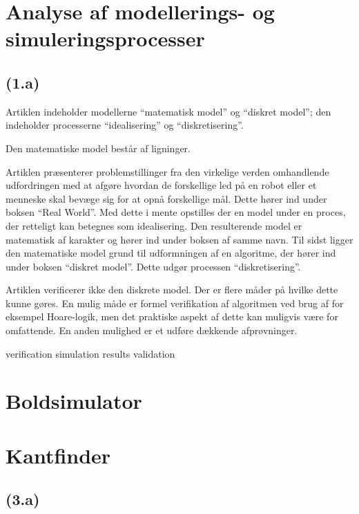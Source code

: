 \documentclass{article}
\author{Mikkel Kragh Mathiesen, Jannik Gram, Rune \& Rasmus Abrahams{\tt (son|en)}}
\title{}
\date{\today}
\begin{document}
\maketitle

\section{Analyse af modellerings- og simuleringsprocesser}
\subsection*{(1.a)}
Artiklen indeholder modellerne ``matematisk model'' og ``diskret model''; den indeholder processerne ``idealisering'' og ``diskretisering''.

Den matematiske model består af ligninger.

Artiklen præsenterer problemstillinger fra den virkelige verden omhandlende udfordringen med at afgøre hvordan de forskellige led på en robot eller et menneske skal bevæge sig for at opnå forskellige mål. Dette hører ind under boksen ``Real World''. Med dette i mente opstilles der en model under en proces, der retteligt kan betegnes som idealisering. Den resulterende model er matematisk af karakter og hører ind under boksen af samme navn. Til sidst ligger den matematiske model grund til udformningen af en algoritme, der hører ind under boksen ``diskret model''. Dette udgør processen ``diskretisering''.

Artiklen verificerer ikke den diskrete model. Der er flere måder på hvilke dette kunne gøres. En mulig måde er formel verifikation af algoritmen ved brug af for eksempel Hoare-logik, men det praktiske aspekt af dette kan muligvis være for omfattende. En anden mulighed er et udføre dækkende afprøvninger.

verification
simulation
results
validation

\section{Boldsimulator}

\section{Kantfinder}

\subsection*{(3.a)}
\end{document}
